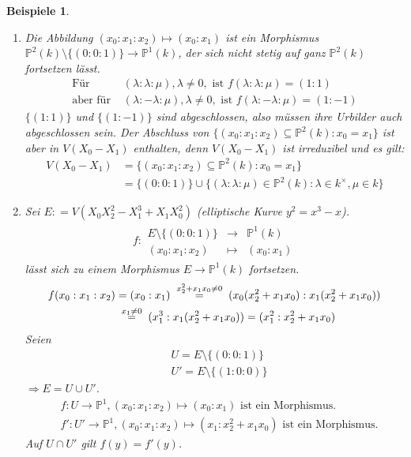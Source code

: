 \documentclass[a4paper,12pt]{report}
\theoremstyle{break}
\theoremstyle{nonumberbreak}
\newtheorem{nnBsp}{Beispiele}
\theoremstyle{nonumberplain}
\newcommand{\defeqr}[0]{\mathrel{\mathop:}=}
\newcommand{\gleichwegen}[1]{\ensuremath{\DOTSB\;\stackrel{#1}{=}\;}}
\newcommand{\Abb}[5]{\ensuremath{#1:\begin{array}{ccc} #2 & \longrightarrow & #3 \\ #4 & \longmapsto & #5 \end{array}}}
\renewcommand{\labelenumi}{\theenumi}
\renewcommand{\theenumi}{(\alph{enumi})}
\begin{document}
\begin{nnBsp}
  \begin{enumerate}
    \renewcommand{\labelenumi}{\arabic{enumi}.)}
  \item Die Abbildung $(x_0:x_1:x_2)\mapsto(x_0:x_1)$ ist ein Morphismus $\mathbb P^2(k)\setminus \{(0:0:1)\}\longrightarrow\mathbb P^1(k)$,
    der sich nicht stetig auf ganz $\mathbb P^2(k)$ fortsetzen lässt.
    \begin{align*}
      \text{Für } &(\lambda:\lambda:\mu),\lambda\neq 0,\text{ ist } f(\lambda:\lambda:\mu)=(1:1) \\
      \text{aber für } &(\lambda:-\lambda:\mu),\lambda\neq 0,\text{ ist } f(\lambda:-\lambda:\mu)=(1:-1)
    \end{align*}
    $\{(1:1)\}$ und $\{(1:-1)\}$ sind abgeschlossen, also müssen ihre Urbilder auch abgeschlossen sein.
    Der Abschluss von $\{(x_0:x_1:x_2)\subseteq\mathbb P^2(k):x_0=x_1\}$ ist aber in $V(X_0-X_1)$ enthalten, 
    denn $V(X_0-X_1)$ ist irreduzibel und es gilt:
    \begin{align*}
      V(X_0-X_1)&=\{(x_0:x_1:x_2)\subseteq\mathbb P^2(k):x_0=x_1\} \\
      &=\{(0:0:1)\}\cup\{(\lambda:\lambda:\mu)\in\mathbb P^2(k):\lambda\in k^\times,\mu\in k\}
    \end{align*}

  \item Sei $E\defeqr V(X_0X_2^2-X_1^3+X_1X_0^2)$ (elliptische Kurve $y^2=x^3-x$). \\
    \begin{align*}
    \Abb{f}{E\setminus\{(0:0:1)\}}{\mathbb P^1(k)}{(x_0:x_1:x_2)}{(x_0:x_1)}      
    \end{align*}
    lässt sich zu einem Morphismus $E\longrightarrow\mathbb P^1(k)$ fortsetzen.
    \begin{align*}
      f(x_0:x_1:x_2)&=(x_0:x_1)\gleichwegen{x_2^2+x_1x_0\neq0}(x_0(x_2^2+x_1x_0):x_1(x_2^2+x_1x_0)) \\
      &\gleichwegen{x_1\neq0}(x_1^3:x_1(x_2^2+x_1x_0))=(x_1^2:x_2^2+x_1x_0)
    \end{align*}
    Seien
    \begin{align*}
      &U =E\setminus\{(0:0:1)\} \\
      &U'=E\setminus\{(1:0:0)\}
    \end{align*}
    $\Rightarrow E=U\cup U'$.
    \begin{align*}
      &f:U\longrightarrow\mathbb P^1, (x_0:x_1:x_2)\mapsto(x_0:x_1) \text{ ist ein Morphismus.} \\
      &f':U'\longrightarrow\mathbb P^1, (x_0:x_1:x_2)\mapsto(x_1:x_2^2+x_1x_0) \text{ ist ein Morphismus.}
    \end{align*}
    Auf $U\cap U'$ gilt $f(y)=f'(y)$.
  \end{enumerate}
\end{nnBsp}
\end{document}
